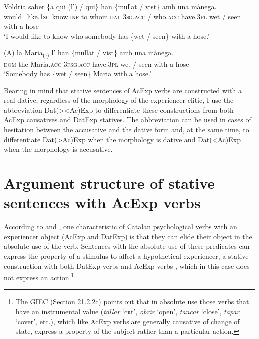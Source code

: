 \documentclass[output=paper,colorlinks,citecolor=brown,modfonts,nonflat]{langsci/langscibook}
\begin{document}
 \ex \label{ex:royo:17d}
 \gll Voldria saber \{a qui (l’) / qui\} han \{mullat / vist\} amb una mànega.\\
 would\_like.\textsc{1sg} know.\textsc{inf} to whom.\textsc{dat} \textsc{3sg.acc} / who.\textsc{acc} have.\textsc{3pl} wet / seen with a hose\\
\glt ‘I would like to know who somebody has \{wet / seen\} with a hose.’

 \ex \label{ex:royo:17e}
 \gll (A) la Maria\textsubscript{(},\textsubscript{)} l’ han \{mullat / vist\} amb una mànega.\\
 \textsc{dom} the Maria.\textsc{acc} \textsc{3fsg.acc} have.\textsc{3pl} wet / seen with a hose\\
\glt ‘Somebody has \{wet / seen\} Maria with a hose.’

 \z
 \z

Bearing in mind that stative sentences of AcExp verbs are constructed with a real dative, regardless of the morphology of the experiencer clitic, I use the abbreviation Dat(>{\textbar}<Ac)Exp to differentiate these constructions from both AcExp causatives and DatExp statives. The abbreviation can be used in cases of hesitation between the accusative and the dative form and, at the same time, to differentiate Dat(>Ac)Exp when the morphology is dative and Dat(<Ac)Exp when the morphology is accusative.

\section{Argument structure of stative sentences with AcExp verbs}\label{sec:royo:5}

According to \citet[Sections 13.3.6.2a-b and 13.3.7.2b]{Rossello2008} and \citet[21.2.2b and 21.5a]{GIEC2016}, one characteristic of Catalan psychological verbs with an experiencer object (AcExp and DatExp) is that they can elide their object in the absolute use of the verb. Sentences with the absolute use of these predicates can express the property of a stimulus to affect a hypothetical experiencer, a stative construction with both DatExp verbs  and AcExp verbs , which in this case does not express an action.\footnote{The GIEC (Section 21.2.2c) points out that in absolute use those verbs that have an instrumental value (\textit{tallar} ‘cut’, \textit{obrir} ‘open’, \textit{tancar} ‘close’, \textit{tapar} ‘cover’, etc.), which like AcExp verbs are generally causative of change of state, express a property of the subject rather than a particular action.}
\end{document}
